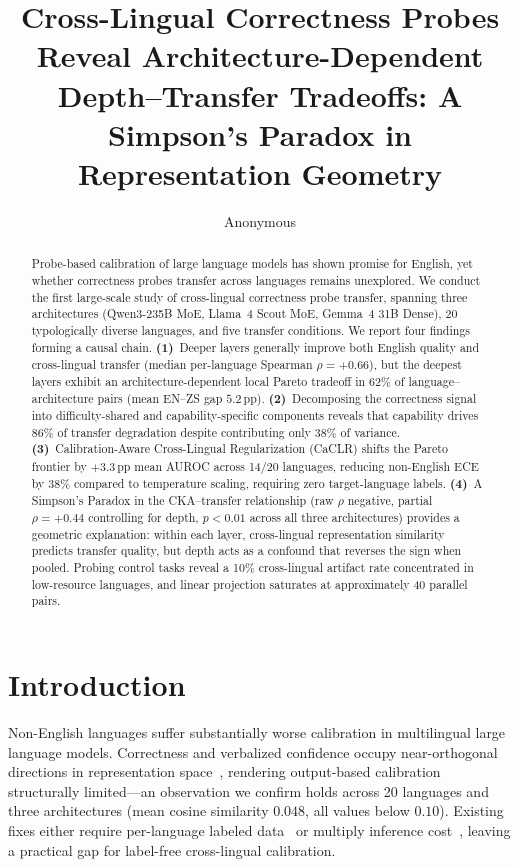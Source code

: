 \documentclass[11pt,a4paper]{article}
\title{Cross-Lingual Correctness Probes Reveal Architecture-Dependent\\Depth--Transfer Tradeoffs: A Simpson's Paradox in Representation Geometry}
\author{Anonymous}
\newcommand{\pp}{\,\text{pp}}
\newcommand{\caclr}{CaCLR}
\begin{document}
\maketitle

\begin{abstract}
Probe-based calibration of large language models has shown promise for English, yet whether correctness probes transfer across languages remains unexplored.
We conduct the first large-scale study of cross-lingual correctness probe transfer, spanning three architectures (Qwen3-235B MoE, Llama~4 Scout MoE, Gemma~4 31B Dense), 20 typologically diverse languages, and five transfer conditions.
We report four findings forming a causal chain.
\textbf{(1)}~Deeper layers generally improve both English quality and cross-lingual transfer (median per-language Spearman $\rho{=}+0.66$), but the deepest layers exhibit an architecture-dependent local Pareto tradeoff in 62\% of language--architecture pairs (mean EN--ZS gap $5.2\pp$).
\textbf{(2)}~Decomposing the correctness signal into difficulty-shared and capability-specific components reveals that capability drives 86\% of transfer degradation despite contributing only 38\% of variance.
\textbf{(3)}~Calibration-Aware Cross-Lingual Regularization (\caclr{}) shifts the Pareto frontier by $+3.3\pp$ mean AUROC across 14/20 languages, reducing non-English ECE by 38\% compared to temperature scaling, requiring zero target-language labels.
\textbf{(4)}~A Simpson's Paradox in the CKA--transfer relationship (raw $\rho$ negative, partial $\rho{=}+0.44$ controlling for depth, $p{<}0.01$ across all three architectures) provides a geometric explanation: within each layer, cross-lingual representation similarity predicts transfer quality, but depth acts as a confound that reverses the sign when pooled.
Probing control tasks reveal a 10\% cross-lingual artifact rate concentrated in low-resource languages, and linear projection saturates at approximately 40 parallel pairs.
\end{abstract}

\section{Introduction}

Non-English languages suffer substantially worse calibration in multilingual large language models.
Correctness and verbalized confidence occupy near-orthogonal directions in representation space~\cite{miao2026steering}, rendering output-based calibration structurally limited---an observation we confirm holds across 20 languages and three architectures (mean cosine similarity $0.048$, all values below $0.10$).
Existing fixes either require per-language labeled data~\cite{zhou2024lace} or multiply inference cost~\cite{wang2024mka}, leaving a practical gap for label-free cross-lingual calibration.
\end{document}

